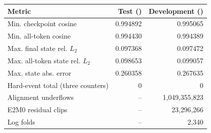 \begin{tabular}{lrr}
\toprule
Metric & Test (\CorrectedHeldoutTraceTokens{}) & Development (\CorrectedLongTraceTokens{}) \\
\midrule
Min. checkpoint cosine & 0.994892 & 0.995065 \\
Min. all-token cosine & 0.994430 & 0.994389 \\
Max. final state rel. $L_2$ & 0.097368 & 0.097472 \\
Max. all-token state rel. $L_2$ & 0.098653 & 0.099057 \\
Max. state abs. error & 0.260358 & 0.267635 \\
Hard-event total (three counters) & 0 & 0 \\
\midrule
Alignment underflows & -- & 1{,}049{,}355{,}823 \\
E2M0 residual clips & -- & 23{,}296{,}266 \\
Log folds & -- & 2{,}340 \\
\bottomrule
\end{tabular}
